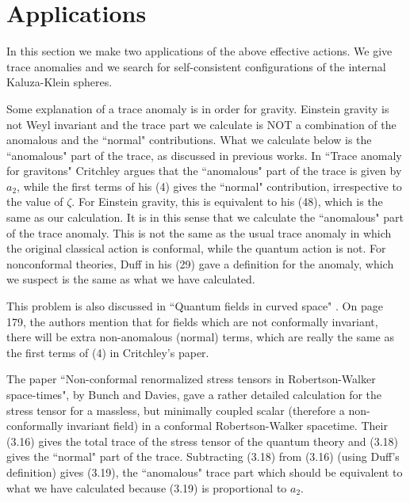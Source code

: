 \documentclass[a4paper,aps,preprint,groupedaddress,showpacs]{revtex4}
\begin{document}
\section{Applications}

In this section we make two applications of the above effective actions. 
We give trace anomalies and we search for self-consistent
configurations of the internal Kaluza-Klein spheres. 

Some explanation of a trace anomaly is in order for gravity. 
Einstein gravity is
not Weyl invariant and the trace part we calculate is
NOT a combination of the anomalous and the ``normal" contributions. What
we calculate below is the ``anomalous" part of the trace, as discussed
in previous works. In ``Trace anomaly for gravitons" \cite{RC} Critchley
argues that the ``anomalous" part of the trace is given by $a_2$, while the first terms of
his (4) gives the ``normal" contribution, irrespective to the value of $\zeta$.
For Einstein gravity, this is equivalent
to his (48), which is the same as our calculation. It is in this sense that we
calculate the ``anomalous" part of the trace anomaly. This is not the same
as the usual trace anomaly in which the
original classical action is conformal, while the quantum action is not.
For nonconformal theories, Duff \cite{MJD} in his (29)
gave a definition for the anomaly, which we suspect is the same as what we have
calculated.

This problem is also discussed in ``Quantum fields in curved space"
\cite{BiD}. On page 179, the authors mention
that for fields which are not conformally invariant, there will be extra
non-anomalous (normal) terms, which are really the same as the first terms
of (4) in Critchley's paper.    

    
The paper ``Non-conformal renormalized stress tensors in Robertson-Walker space-times", 
\cite{BuD} by Bunch and Davies,
gave a rather detailed calculation for the stress tensor for a massless,
but minimally coupled scalar (therefore a non-conformally invariant field) in a conformal
Robertson-Walker spacetime. Their (3.16) gives the total trace of the
stress tensor of the quantum theory and (3.18) gives the ``normal" part
of the trace. Subtracting (3.18) from (3.16) (using Duff's definition) gives
(3.19), the ``anomalous" trace part which should be equivalent to
what we have calculated because (3.19) is proportional to $a_2$. 
                
\end{document}
